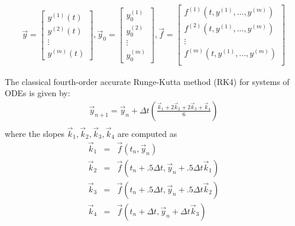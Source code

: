 \documentclass[12pt]{article}
\begin{document}
\begin{eqnarray}
   \overrightarrow{y}= \begin{bmatrix}
           y^{(1)}(t) \\
          y^{(2)}(t) \\
           \vdots \\
           y^{(m)}(t)
         \end{bmatrix},
 \overrightarrow{y}_0= \begin{bmatrix}
           y_0^{(1)} \\
          y_0^{(2)} \\
           \vdots \\
           y_0^{(m)}
         \end{bmatrix},
 \overrightarrow{f}= \begin{bmatrix}
           f^{(1)}(t,y^{(1)}, ... , y^{(m)}) \\
           f^{(2)}(t,y^{(1)}, ... , y^{(m)}) \\
           \vdots \\
           f^{(m)}(t,y^{(1)}, ... , y^{(m)}) \\
         \end{bmatrix}
\end{eqnarray}


The classical fourth-order accurate Runge-Kutta method (RK4) for systems of ODEs is given by:
\begin{eqnarray}
 \overrightarrow{y}_{n+1}= \overrightarrow{y}_n+\Delta t (\frac{\overrightarrow{k}_1+2\overrightarrow{k}_2+2\overrightarrow{k}_3+\overrightarrow{k}_4}{6})\\\nonumber
\end{eqnarray}
 where the slopes $\overrightarrow{k}_1, \overrightarrow{k}_2, \overrightarrow{k}_3, \overrightarrow{k}_4$ are computed as
\begin{eqnarray} 
\overrightarrow{k}_1 &=& \overrightarrow{f}(t_n, \overrightarrow{y}_n) \\\nonumber
\overrightarrow{k}_2 &=&  \overrightarrow{f}(t_n+.5 \Delta t, \overrightarrow{y}_n + .5 \Delta t \overrightarrow{k}_1) \\\nonumber
\overrightarrow{k}_3 &=&  \overrightarrow{f}(t_n+.5 \Delta t, \overrightarrow{y}_n + .5 \Delta t \overrightarrow{k}_2) \\\nonumber
\overrightarrow{k}_4 &=&  \overrightarrow{f}(t_n+\Delta t, \overrightarrow{y}_n + \Delta t \overrightarrow{k}_3) \\\nonumber
 \end{eqnarray}
\end{document}
